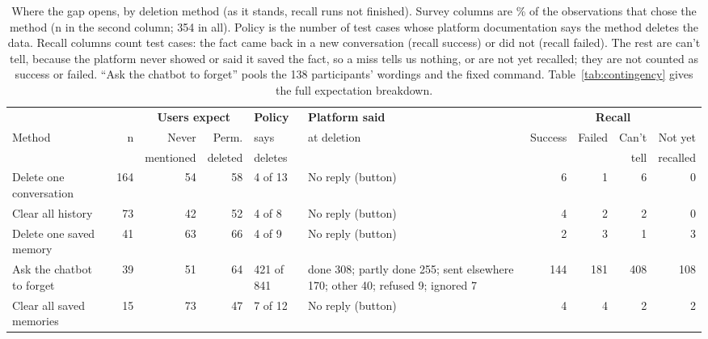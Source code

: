 \documentclass[conference,compsoc]{IEEEtran}
\begin{document}
\begin{table}[t]
\centering
\caption{Where the gap opens, by deletion method (as it stands, recall runs not finished). Survey columns are \% of the observations that chose the method (n in the second column; 354 in all). Policy is the number of test cases whose platform documentation says the method deletes the data. Recall columns count test cases: the fact came back in a new conversation (recall success) or did not (recall failed). The rest are can't tell, because the platform never showed or said it saved the fact, so a miss tells us nothing, or are not yet recalled; they are not counted as success or failed. ``Ask the chatbot to forget'' pools the 138 participants' wordings and the fixed command. Table~\ref{tab:contingency} gives the full expectation breakdown.}
\label{tab:gap-method}
\small
\setlength{\tabcolsep}{3.5pt}
\begin{tabular}{lrrrlp{3.4cm}rrrr}
\toprule
 & & \multicolumn{2}{c}{\textbf{Users expect}} & \textbf{Policy} & \textbf{Platform said} & \multicolumn{4}{c}{\textbf{Recall}} \\
\cmidrule(lr){3-4}\cmidrule(lr){7-10}
Method & n & Never & Perm. & says & at deletion & Success & Failed & Can't & Not yet \\
 & & mentioned & deleted & deletes & & & & tell & recalled \\
\midrule
Delete one conversation & 164 & 54 & 58 & 4 of 13 & No reply (button) & 6 & 1 & 6 & 0 \\
Clear all history & 73 & 42 & 52 & 4 of 8 & No reply (button) & 4 & 2 & 2 & 0 \\
Delete one saved memory & 41 & 63 & 66 & 4 of 9 & No reply (button) & 2 & 3 & 1 & 3 \\
Ask the chatbot to forget & 39 & 51 & 64 & 421 of 841 & done 308; partly done 255; sent elsewhere 170; other 40; refused 9; ignored 7 & 144 & 181 & 408 & 108 \\
Clear all saved memories & 15 & 73 & 47 & 7 of 12 & No reply (button) & 4 & 4 & 2 & 2 \\
\bottomrule
\end{tabular}
\end{table}

\end{document}
